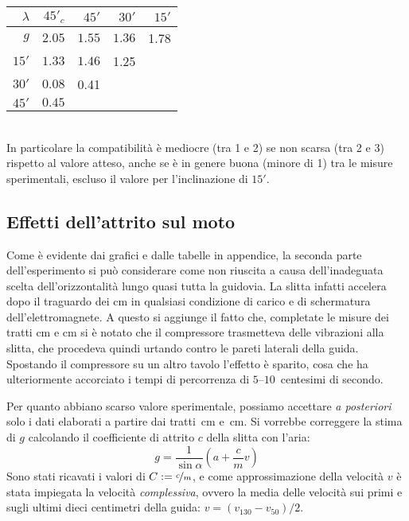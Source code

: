\documentclass[italian,a4paper]{article}
\begin{document}
\begin{table}[h]\centering
\begin{tabular}{r|*4{r}}
  $\lambda$	& $45'_c$ 	& $45'$ 	& $30'$ 	&$15'$	\\
 \hline
 $g$ 		& $2.05$	& $1.55$	&$1.36$		&1.78	\\
 $15'$  	& $1.33$	& $1.46$	&1.25		& \\
 $30'$  	& $0.08$	& 0.41		& 	&\\
 $45'$  	& $0.45$	& 		& 	&
\end{tabular}
\end{table}\\
In particolare la compatibilità è mediocre (tra 1 e 2) se non scarsa (tra 2 e 3) rispetto al valore atteso, anche se è in genere buona (minore di 1) tra le misure sperimentali, escluso il valore per l'inclinazione di $15'$.
\subsection{Effetti dell'attrito sul moto}
Come è evidente dai grafici e dalle tabelle in appendice, la seconda parte dell'esperimento si può considerare come non riuscita a causa dell'inadeguata scelta dell'orizzontalità lungo quasi tutta la guidovia. La slitta infatti accelera dopo il traguardo dei \unit[70]{cm} in qualsiasi condizione di carico e di schermatura dell'elettromagnete. A questo si aggiunge il fatto che, completate le misure dei tratti \unit[40--60]{cm} e \unit[50--70]{cm} si è notato che il compressore trasmetteva delle vibrazioni alla slitta, che procedeva quindi urtando contro le pareti laterali della guida. Spostando il compressore su un altro tavolo l'effetto è sparito, cosa che ha ulteriormente accorciato i tempi di percorrenza di $5$--$10$~centesimi di secondo.

Per quanto abbiano scarso valore sperimentale, possiamo accettare \emph{a posteriori} solo i dati elaborati a partire dai tratti~\unit[40--60]{cm} e~\unit[50--70]{cm}. Si vorrebbe correggere la stima di $g$ calcolando il coefficiente di attrito $c$ della slitta con l'aria:
\begin{equation}\label{g}
 g = \dfrac{1}{\sin\alpha}\left(a + \dfrac{c}{m}v \right)
\end{equation}
Sono stati ricavati i valori di $C : = \nicefrac{c}{m}$, e come approssimazione della velocità $v$ è stata impiegata la velocità \emph{complessiva}, ovvero la media delle velocità sui primi e sugli ultimi dieci centimetri della guida: $v = (v_{130}-v_{50})/2$.
\end{document}
